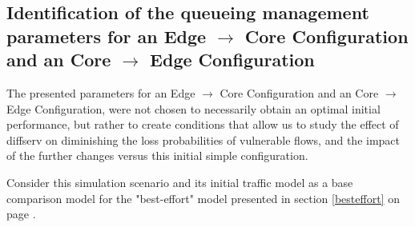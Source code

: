 \documentclass[conference,compsoc]{IEEEtran}
\begin{document}
     \subsection{Identification of the queueing management parameters for an Edge $\rightarrow$  Core Configuration and an Core $\rightarrow$  Edge Configuration}
     
     The presented parameters for an Edge $\rightarrow$  Core Configuration and an Core $\rightarrow$  Edge Configuration, were not chosen to necessarily obtain an optimal initial performance, but rather to create conditions that allow us to study the effect of diffserv on diminishing the loss probabilities of vulnerable flows, and the impact of the further changes versus this initial simple configuration.\par 
     
     Consider this simulation scenario and its initial traffic model as a base comparison model for the "best-effort" model presented in section \ref{besteffort} on page \pageref{besteffort}.
\end{document}
